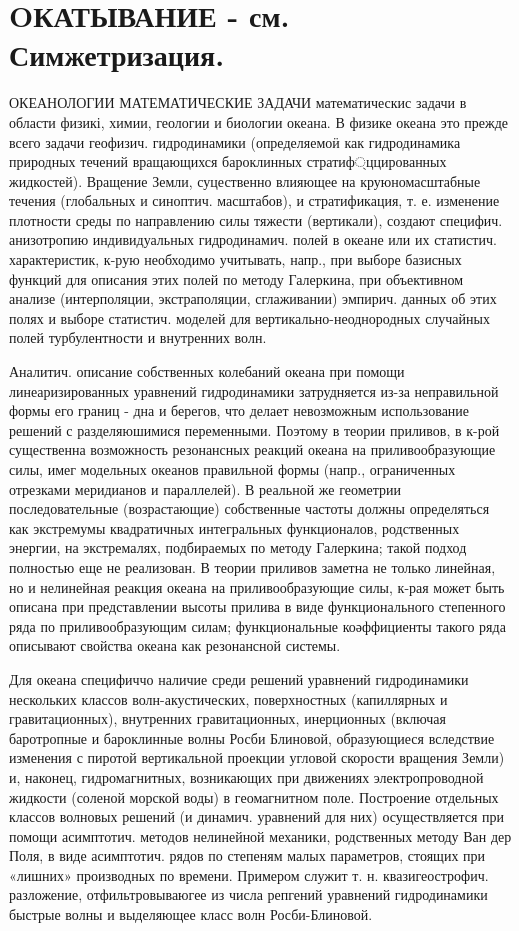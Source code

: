 \documentclass[10pt]{article}
\begin{document}
\section{OКАТЫВАНИЕ - см. Симжетризация.}
ОКЕАНОЛОГИИ МАТЕМАТИЧЕСКИЕ ЗАДАЧИ математическис задачи в области физикі, химии, геологии и биологии океана. В физике океана это прежде всего задачи геофизич. гидродинамики (определяемоӥ как гидродинамика природных течений вращающихся бароклинных стратиф্ццированных жидкостей). Вращение Земли, суцественно влияющее на круюномасштабные течения (глобальных и синоптич. масштабов), и стратификация, т. е. изменение плотности среды по направлению силы тяжести (вертикали), создают специфич. анизотропию индивидуальных гидродинамич. полей в океане или их статистич. характеристик, к-рую необходимо учитывать, напр., при выборе базисных функций для описания этих полей по методу Галеркина, при объективном анализе (интерполяции, экстраполяции, сглаживании) эмпирич. данных об этих полях и выборе статистич. моделей для вертикально-неоднородных случайных полей турбулентности и внутренних волн.

Аналитич. описание собственных колебаний океана при помощи линеаризированных уравнений гидродинамики затрудняется из-за неправильной формы его границ - дна и берегов, что делает невозможным использование решений с разделяюшимися переменными. Поэтому в теории приливов, в к-рой существенна возможность резонансных реакций океана на приливообразующие силы, имег модельных океанов правильной формы (напр., ограниченных отрезками меридианов и параллелей). В реальной же геометрии последовательные (возрастающие) собственные частоты должны определяться как экстремумы квадратичных интегральных функционалов, родственных энергии, на экстремалях, подбираемых по методу Галеркина; такой подход полностью еще не реализован. В теории приливов заметна не только линейная, но и нелинейная реакция океана на приливообразующие силы, к-рая может быть описана при представлении высоты прилива в виде функционального степенного ряда по приливообразующим силам; функциональные коәффициенты такого ряда описывают свойства океана как резонансной системы.

Для океана специфиччо наличие среди решений уравнений гидродинамики нескольких классов волн-акустических, поверхностных (капиллярных и гравитационных), внутренних гравитационных, инерционных (включая баротропные и бароклинные волны Росби Блиновой, образующиеся вследствие изменения с пиротой вертикальной проекции угловой скорости вращения Земли) и, наконец, гидромагнитных, возникающих при движениях электропроводной жидкости (соленой морской воды) в геомагнитном поле. Построение отдельных классов волновых решений (и динамич. уравнений для них) осуществляется при помощи асимптотич. методов нелинейной механики, родственных методу Ван дер Поля, в виде асимптотич. рядов по степеням малых параметров, стоящих при «лишних» производных по времени. Примером служит т. н. квазигеострофич. разложение, отфильтровываюгее из числа репгений уравнений гидродинамики быстрые волны и выделяющее класс волн Росби-Блиновой.
\end{document}
